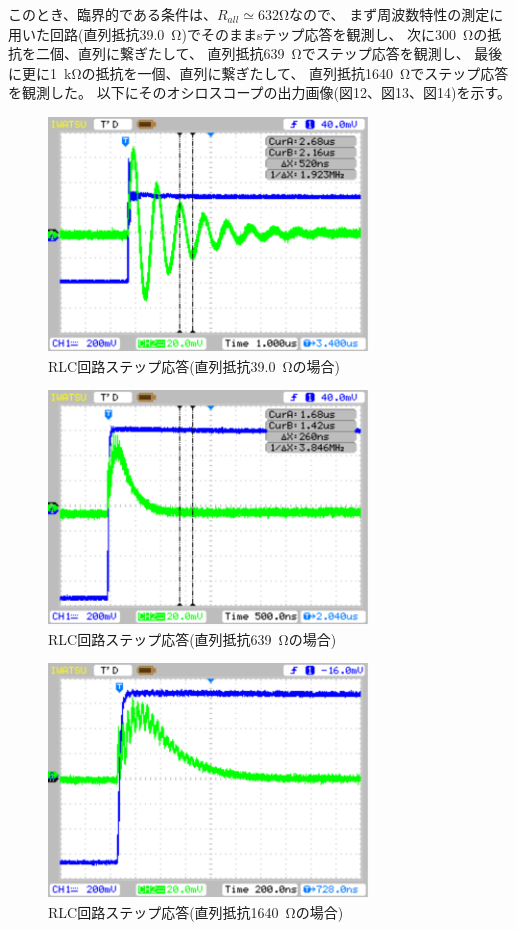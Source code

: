\documentclass[10pt,a4j,dvipdfmx]{jsarticle}
\begin{document}
このとき、臨界的である条件は、$R_{all} \simeq 632\si{\ohm}$なので、
まず周波数特性の測定に用いた回路(直列抵抗\SI{39.0}{\ohm})でそのままsテップ応答を観測し、
次に\SI{300}{\ohm}の抵抗を二個、直列に繋ぎたして、
直列抵抗\SI{639}{\ohm}でステップ応答を観測し、
最後に更に\SI{1}{\kilo\ohm}の抵抗を一個、直列に繋ぎたして、
直列抵抗\SI{1640}{\ohm}でステップ応答を観測した。
以下にそのオシロスコープの出力画像(図12、図13、図14)を示す。
\begin{figure}[H]
  \centering
  \includegraphics[width=8.5cm]{sindougensui.pdf}
  \caption{RLC回路ステップ応答(直列抵抗\SI{39.0}{\ohm}の場合)}
\end{figure}
\begin{figure}[H]
  \centering
  \includegraphics[width=8.5cm]{rinkaigensui.pdf}
  \caption{RLC回路ステップ応答(直列抵抗\SI{639}{\ohm}の場合)}
\end{figure}
\begin{figure}[H]
  \centering
  \includegraphics[width=8.5cm]{kagensui.pdf}
  \caption{RLC回路ステップ応答(直列抵抗\SI{1640}{\ohm}の場合)}
\end{figure}
\end{document}
